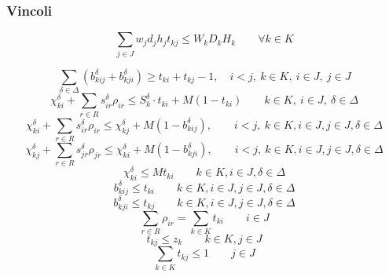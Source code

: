 \documentclass{scrartcl}
\begin{document}
\subsubsection{Vincoli}
\begin{equation}
\label{eq:constraint:volume}
\sum_{j \in J} w_j d_j h_j t_{kj} \leq W_kD_kH_k \quad\quad \forall k \in K 
\end{equation}

\begin{equation}
\sum_{\delta\in\Delta}(b_{kij}^\delta + b_{kji}^\delta) \geq t_{ki} + t_{kj} - 1, \quad i < j,\ k \in K,\ i \in J,\ j \in J
\end{equation}
\begin{equation}
\label{eq:constraint:coodinateLessThanSkdelta}
\chi_{ki}^\delta + \sum_{r \in R} s_{ir}^\delta \rho_{ir} \leq S_k^\delta \cdot t_{ki} + M (1 - t_{ki}) \quad \quad k \in K,\ i \in J,\ \delta \in \Delta
\end{equation}
\begin{equation}
\chi_{ki}^\delta + \sum_{r \in R} s_{ir}^\delta \rho_{ir} \leq \chi_{kj}^\delta + M(1 - b_{kij}^\delta), \quad \quad i < j,\ k \in K, i \in J, j \in J, \delta \in \Delta
\end{equation}
\begin{equation}
\chi_{kj}^\delta + \sum_{r \in R} s_{jr}^\delta \rho_{jr} \leq \chi_{ki}^\delta + M(1 - b_{kji}^\delta), \quad \quad i < j,\ k \in K, i \in J, j \in J, \delta \in \Delta
\end{equation}
\begin{equation}
\chi_{ki}^\delta \leq M t_{ki}\quad\quad k \in K, i \in J, \delta \in \Delta
\end{equation}
\begin{equation}
b_{kij}^\delta \leq t_{ki}\quad \quad k \in K, i \in J, j \in J, \delta \in \Delta
\end{equation}
\begin{equation}
b_{kji}^\delta \leq t_{kj} \quad \quad k \in K, i \in J, j \in J, \delta \in \Delta
\end{equation}
\begin{equation}
\label{eq:constraint:rho:ir:leq:sumk}
\sum_{r \in R} \rho_{ir} = \sum_{k \in K} t_{ki}\quad \quad i \in J
\end{equation}
\begin{equation}
\label{constraint:multi:tkzk}
t_{kj} \leq z_k\quad \quad k \in K, j \in J
\end{equation}
\begin{equation}
\label{constraint:multi:onlyInOneKnapsack}
\sum_{k \in K} t_{kj} \leq 1 \quad \quad j \in J
\end{equation}
\end{document}
